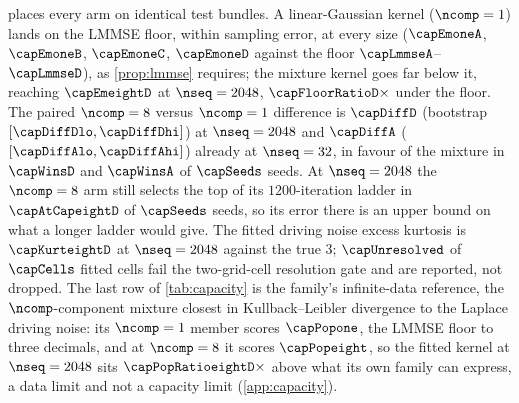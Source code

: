 
 places every arm on identical test bundles. A linear-Gaussian
kernel ($\ncomp=1$) lands on the LMMSE floor, within sampling error, at every size
($\capEmoneA$, $\capEmoneB$, $\capEmoneC$, $\capEmoneD$ against the floor
$\capLmmseA$--$\capLmmseD$), as \cref{prop:lmmse} requires; the mixture kernel goes
far below it, reaching $\capEmeightD$ at $\nseq=2048$, $\capFloorRatioD\times$ under the
floor. The paired $\ncomp=8$ versus $\ncomp=1$ difference is
$\capDiffD$ (bootstrap $[\capDiffDlo,\capDiffDhi]$) at $\nseq=2048$ and
$\capDiffA$ ($[\capDiffAlo,\capDiffAhi]$) already at $\nseq=32$, in favour of the
mixture in $\capWinsD$ and $\capWinsA$ of $\capSeeds$ seeds. At $\nseq=2048$ the
$\ncomp=8$ arm still selects the top of its $1200$-iteration ladder in $\capAtCapeightD$ of
$\capSeeds$ seeds, so its error there is an upper bound on what a longer ladder would give. The fitted driving noise
excess kurtosis is $\capKurteightD$ at $\nseq=2048$ against the true $3$; $\capUnresolved$
of $\capCells$ fitted cells fail the two-grid-cell resolution gate and are reported, not
dropped. The last row of \cref{tab:capacity} is the family's infinite-data reference, the
$\ncomp$-component mixture closest in Kullback--Leibler divergence to the Laplace
driving noise: its $\ncomp=1$ member scores $\capPopone$, the LMMSE floor to three decimals,
and at $\ncomp=8$ it scores $\capPopeight$, so the fitted kernel at $\nseq=2048$ sits
$\capPopRatioeightD\times$ above what its own family can express, a data limit and not a
capacity limit (\cref{app:capacity}).

